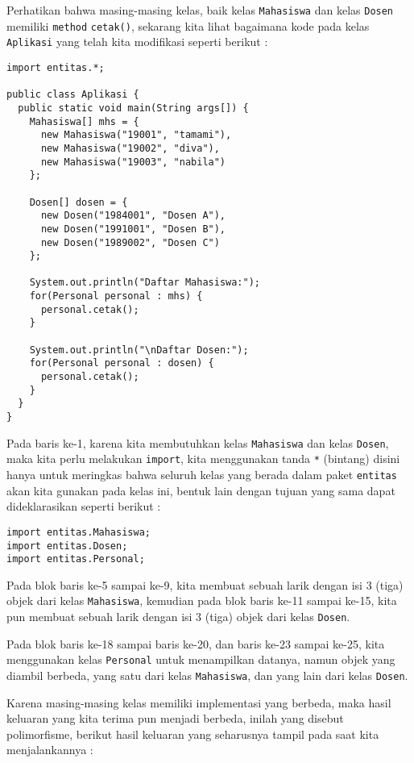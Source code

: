 Perhatikan bahwa masing-masing kelas, baik kelas \texttt{Mahasiswa} dan kelas \texttt{Dosen} memiliki \texttt{method} \texttt{cetak()}, sekarang kita lihat bagaimana kode pada kelas \texttt{Aplikasi} yang telah kita modifikasi seperti berikut :

\begin{lstlisting}
import entitas.*;

public class Aplikasi {
  public static void main(String args[]) {
    Mahasiswa[] mhs = {
      new Mahasiswa("19001", "tamami"),
      new Mahasiswa("19002", "diva"),
      new Mahasiswa("19003", "nabila")
    };

    Dosen[] dosen = {
      new Dosen("1984001", "Dosen A"),
      new Dosen("1991001", "Dosen B"),
      new Dosen("1989002", "Dosen C")
    };

    System.out.println("Daftar Mahasiswa:");
    for(Personal personal : mhs) {
      personal.cetak();
    }

    System.out.println("\nDaftar Dosen:");
    for(Personal personal : dosen) {
      personal.cetak();
    }
  }
}
\end{lstlisting}

Pada baris ke-1, karena kita membutuhkan kelas \texttt{Mahasiswa} dan kelas \texttt{Dosen}, maka kita perlu melakukan \texttt{import}, kita menggunakan tanda \texttt{*} (bintang) disini hanya untuk meringkas bahwa seluruh kelas yang berada dalam paket \texttt{entitas} akan kita gunakan pada kelas ini, bentuk lain dengan tujuan yang sama dapat dideklarasikan seperti berikut :

\begin{lstlisting}
import entitas.Mahasiswa;
import entitas.Dosen;
import entitas.Personal;
\end{lstlisting}

Pada blok baris ke-5 sampai ke-9, kita membuat sebuah larik dengan isi 3 (tiga) objek dari kelas \texttt{Mahasiswa}, kemudian pada blok baris ke-11 sampai ke-15, kita pun membuat sebuah larik dengan isi 3 (tiga) objek dari kelas \texttt{Dosen}.

Pada blok baris ke-18 sampai baris ke-20, dan baris ke-23 sampai ke-25, kita menggunakan kelas \texttt{Personal} untuk menampilkan datanya, namun objek yang diambil berbeda, yang satu dari kelas \texttt{Mahasiswa}, dan yang lain dari kelas \texttt{Dosen}. 

Karena masing-masing kelas memiliki implementasi yang berbeda, maka hasil keluaran yang kita terima pun menjadi berbeda, inilah yang disebut polimorfisme, berikut hasil keluaran yang seharusnya tampil pada saat kita menjalankannya :

